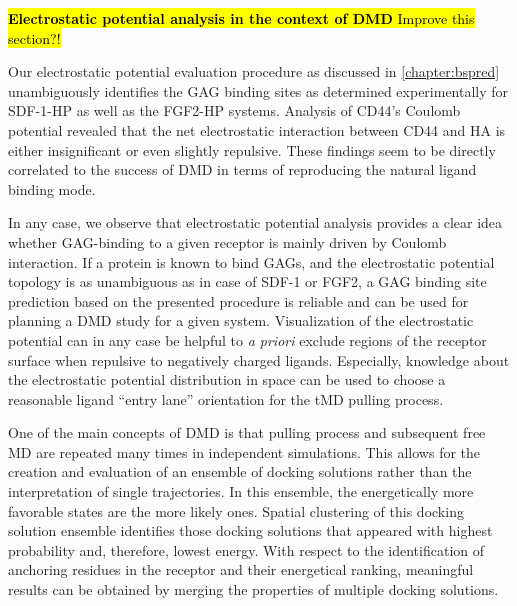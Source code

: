 
\hl{
\textbf{Electrostatic potential analysis in the context of DMD}
Improve this section?!}

Our electrostatic potential evaluation procedure as discussed in
\cref{chapter:bspred} unambiguously identifies the GAG binding sites as
determined experimentally for SDF-1-HP as well as the FGF2-HP systems. Analysis
of CD44's Coulomb potential revealed that the net electrostatic interaction
between CD44 and HA is either insignificant or even slightly repulsive. These
findings seem to be directly correlated to the success of DMD in terms of
reproducing the natural ligand binding mode.

In any case, we observe that electrostatic potential analysis provides a clear
idea whether GAG-binding to a given receptor is mainly driven by Coulomb
interaction. If a protein is known to bind GAGs, and the electrostatic potential
topology is as unambiguous as in case of SDF-1 or FGF2, a GAG binding site
prediction based on the presented procedure is reliable and can be used for
planning a DMD study for a given system. Visualization of the electrostatic
potential can in any case be helpful to \textit{a priori} exclude regions of the
receptor surface when repulsive to negatively charged ligands. Especially,
knowledge about the electrostatic potential distribution in space can be used to
choose a reasonable ligand \enquote{entry lane} orientation for the tMD pulling
process.


One of the main concepts of DMD is that pulling process and subsequent free MD
are repeated many times in independent simulations. This allows for the creation
and evaluation of an ensemble of docking solutions rather than the
interpretation of single trajectories. In this ensemble, the energetically more
favorable states are the more likely ones. Spatial clustering of this docking
solution ensemble identifies those docking solutions that appeared with highest
probability and, therefore, lowest energy. With respect to the identification of
anchoring residues in the receptor and their energetical ranking, meaningful
results can be obtained by merging the properties of multiple docking solutions.

